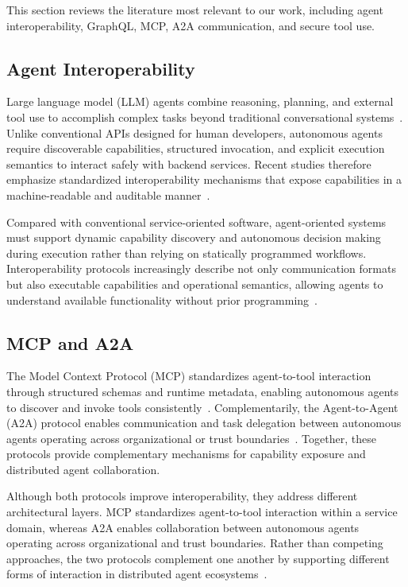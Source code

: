\documentclass[conference]{IEEEtran}
\begin{document}
This section reviews the literature most relevant to our work, including
agent interoperability, GraphQL, MCP, A2A communication, and secure tool use.

\subsection{Agent Interoperability}

Large language model (LLM) agents combine reasoning, planning, and external
tool use to accomplish complex tasks beyond traditional conversational
systems~\cite{ref1}. Unlike conventional APIs designed for human developers,
autonomous agents require discoverable capabilities, structured invocation,
and explicit execution semantics to interact safely with backend services.
Recent studies therefore emphasize standardized interoperability mechanisms
that expose capabilities in a machine-readable and auditable
manner~\cite{ref2,ref4}.

Compared with conventional service-oriented software, agent-oriented systems
must support dynamic capability discovery and autonomous decision making
during execution rather than relying on statically programmed workflows.
Interoperability protocols increasingly describe not only communication
formats but also executable capabilities and operational semantics, allowing
agents to understand available functionality without prior
programming~\cite{ref2}.

\subsection{MCP and A2A}

The Model Context Protocol (MCP) standardizes agent-to-tool interaction
through structured schemas and runtime metadata, enabling autonomous agents
to discover and invoke tools consistently~\cite{ref2}. Complementarily, the
Agent-to-Agent (A2A) protocol enables communication and task delegation
between autonomous agents operating across organizational or trust
boundaries~\cite{ref3}. Together, these protocols provide complementary
mechanisms for capability exposure and distributed agent collaboration.

Although both protocols improve interoperability, they address different
architectural layers. MCP standardizes agent-to-tool interaction within a
service domain, whereas A2A enables collaboration between autonomous agents
operating across organizational and trust boundaries. Rather than competing
approaches, the two protocols complement one another by supporting different
forms of interaction in distributed agent ecosystems~\cite{ref3}.
\end{document}
